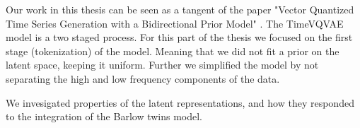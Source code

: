 \documentclass[../../thesis.tex]{subfiles}
\begin{document}



Our work in this thesis can be seen as a tangent of the paper "Vector Quantized Time Series Generation with a Bidirectional Prior Model" \cite{TimeVQVAE}. The TimeVQVAE model is a two staged process. For this part of the thesis we focused on the first stage (tokenization) of the model. Meaning that we did not fit a prior on the latent space, keeping it uniform. Further we simplified the model by not separating the high and low frequency components of the data.


We invesigated properties of the latent representations, and how they responded to the integration of the Barlow twins model. 
\end{document}
